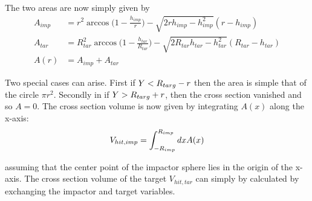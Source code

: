 The two areas are now simply given by
\begin{align}
\label{ch07_sec01_eq004}
A_{imp} &= r^2 \arccos{\Big( 1 - \frac{h_{imp}}{r} \Big) } - \sqrt{2 r h_{imp} - h_{imp}^2} (r - h_{imp} )  \\
A_{tar} &= R_{tar}^2 \arccos{\Big(1 - \frac{h_{tar}}{R_{tar}} \Big)  } - \sqrt{2 R_{tar} h_{tar} - h_{tar}^2} (R_{tar} - h_{tar} )  \\
A(r) &= A_{imp} + A_{tar}
\end{align}

Two special cases can arise. First if $Y < R_{targ} - r $ then the area is simple that of the circle $\pi r^2$. Secondly in if $Y > R_{targ} + r$, then the cross section vanished and so $A = 0$. The cross section volume is now given by integrating $A(x)$ along the x-axis:
\begin{align}
\label{ch07_sec01_eq002}
V_{hit, imp} = \int_{-R_{imp}}^{R_{imp}} dx A(x)
\end{align}

assuming that the center point of the impactor sphere lies in the origin of the x-axis. The cross section volume of the target $V_{hit, tar}$ can simply by calculated by exchanging the impactor and target variables. 

